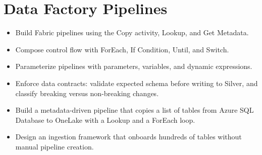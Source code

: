 \chapter{Data Factory Pipelines}
%

\begin{objectives}
\begin{itemize}
    \item Build Fabric pipelines using the Copy activity, Lookup, and Get Metadata.
    \item Compose control flow with ForEach, If Condition, Until, and Switch.
    \item Parameterize pipelines with parameters, variables, and dynamic expressions.
    \item Enforce data contracts: validate expected schema before writing to Silver, and classify breaking versus non-breaking changes.
    \item Build a metadata-driven pipeline that copies a list of tables from Azure SQL Database to OneLake with a Lookup and a ForEach loop.
    \item Design an ingestion framework that onboards hundreds of tables without manual pipeline creation.
\end{itemize}
\end{objectives}

